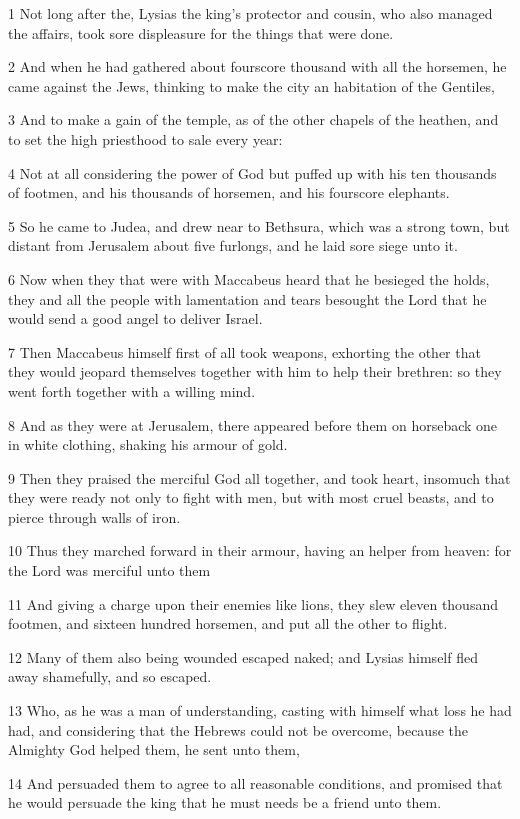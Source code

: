 \par 1 Not long after the, Lysias the king's protector and cousin, who also managed the affairs, took sore displeasure for the things that were done.
\par 2 And when he had gathered about fourscore thousand with all the horsemen, he came against the Jews, thinking to make the city an habitation of the Gentiles,
\par 3 And to make a gain of the temple, as of the other chapels of the heathen, and to set the high priesthood to sale every year:
\par 4 Not at all considering the power of God but puffed up with his ten thousands of footmen, and his thousands of horsemen, and his fourscore elephants.
\par 5 So he came to Judea, and drew near to Bethsura, which was a strong town, but distant from Jerusalem about five furlongs, and he laid sore siege unto it.
\par 6 Now when they that were with Maccabeus heard that he besieged the holds, they and all the people with lamentation and tears besought the Lord that he would send a good angel to deliver Israel.
\par 7 Then Maccabeus himself first of all took weapons, exhorting the other that they would jeopard themselves together with him to help their brethren: so they went forth together with a willing mind.
\par 8 And as they were at Jerusalem, there appeared before them on horseback one in white clothing, shaking his armour of gold.
\par 9 Then they praised the merciful God all together, and took heart, insomuch that they were ready not only to fight with men, but with most cruel beasts, and to pierce through walls of iron.
\par 10 Thus they marched forward in their armour, having an helper from heaven: for the Lord was merciful unto them
\par 11 And giving a charge upon their enemies like lions, they slew eleven thousand footmen, and sixteen hundred horsemen, and put all the other to flight.
\par 12 Many of them also being wounded escaped naked; and Lysias himself fled away shamefully, and so escaped.
\par 13 Who, as he was a man of understanding, casting with himself what loss he had had, and considering that the Hebrews could not be overcome, because the Almighty God helped them, he sent unto them,
\par 14 And persuaded them to agree to all reasonable conditions, and promised that he would persuade the king that he must needs be a friend unto them.
